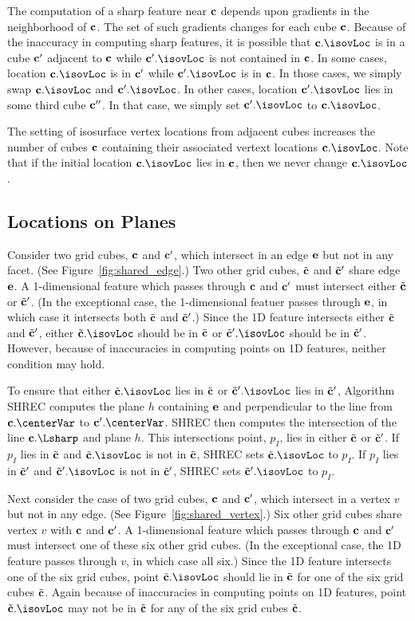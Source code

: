 The computation of a sharp feature near $\mathbf{c}$ depends
upon gradients in the neighborhood of $\mathbf{c}$.
The set of such gradients changes for each cube $\mathbf{c}$.
Because of the inaccuracy in computing sharp features,
it is possible that $\cb.\isovLoc$ is in a cube $\mathbf{c}'$ adjacent to $\mathbf{c}$
while $\cb'.\isovLoc$ is not contained in $\mathbf{c}$.
In some cases,
location $\cb.\isovLoc$ is in $\mathbf{c}'$ while $\cb'.\isovLoc$ is in $\mathbf{c}$.
In those cases,
we simply swap $\cb.\isovLoc$ and $\cb'.\isovLoc$.
In other cases, location $\cb'.\isovLoc$ lies in some third cube $\mathbf{c}''$.
In that case, we simply set $\cb'.\isovLoc$ to $\cb.\isovLoc$.

The setting of isosurface vertex locations from adjacent cubes
increases the number of cubes $\mathbf{c}$ containing 
their associated vertext locations $\cb.\isovLoc$.
Note that if the initial location $\cb.\isovLoc$ lies in $\mathbf{c}$,
then we never change $\cb.\isovLoc$.


\subsection{Locations on Planes}

Consider two grid cubes, $\mathbf{c}$ and $\mathbf{c}'$, 
which intersect in an edge $\mathbf{e}$ but not in any facet.
(See Figure~\ref{fig:shared_edge}.)
Two other grid cubes, ${\tilde{\mathbf{c}}}$ and ${\tilde{\mathbf{c}}}'$ share edge $\mathbf{e}$.
A 1-dimensional feature which passes through $\mathbf{c}$ and $\mathbf{c}'$ must intersect
either ${\tilde{\mathbf{c}}}$ or ${\tilde{\mathbf{c}}}'$.
(In the exceptional case, the 1-dimensional featuer passes through $\mathbf{e}$,
in which case it intersects both ${\tilde{\mathbf{c}}}$ and ${\tilde{\mathbf{c}}}'$.)
Since the 1D feature intersects either ${\tilde{\mathbf{c}}}$ and ${\tilde{\mathbf{c}}}'$,
either $\tcb.\isovLoc$ should be in ${\tilde{\mathbf{c}}}$ 
or $\tcb'.\isovLoc$ should be in ${\tilde{\mathbf{c}}}'$.
However, because of inaccuracies in computing points on 1D features,
neither condition may hold.

To ensure that either $\tcb.\isovLoc$ lies in ${\tilde{\mathbf{c}}}$
or $\tcb'.\isovLoc$ lies in ${\tilde{\mathbf{c}}}'$,
Algorithm SHREC computes the plane $h$ containing $\mathbf{e}$
and perpendicular to the line from $\cb.\centerVar$ to $\cb'.\centerVar$.
SHREC then computes the intersection of the line $\cb.\Lsharp$ 
and plane $h$.
This intersections point, $p_I$, lies in either ${\tilde{\mathbf{c}}}$ or ${\tilde{\mathbf{c}}}'$.
If $p_I$ lies in ${\tilde{\mathbf{c}}}$ and $\tcb.\isovLoc$ is not in ${\tilde{\mathbf{c}}}$,
SHREC sets $\tcb.\isovLoc$ to $p_I$.
If $p_I$ lies in ${\tilde{\mathbf{c}}}'$ and $\tcb'.\isovLoc$ is not in ${\tilde{\mathbf{c}}}'$,
SHREC sets $\tcb'.\isovLoc$ to $p_I$.

Next consider the case of two grid cubes, $\mathbf{c}$ and $\mathbf{c}'$, 
which intersect in a vertex $v$ but not in any edge.
(See Figure~\ref{fig:shared_vertex}.)
Six other grid cubes share vertex $v$ with $\mathbf{c}$ and $\mathbf{c}'$.
A 1-dimensional feature which passes through $\mathbf{c}$ and $\mathbf{c}'$ must intersect
one of these six other grid cubes.
(In the exceptional case, the 1D feature passes through $v$,
in which case all six.)
Since the 1D feature intersects one of the six grid cubes,
point $\tcb.\isovLoc$ should lie in ${\tilde{\mathbf{c}}}$ for one of the six grid cubes ${\tilde{\mathbf{c}}}$.
Again because of inaccuracies in computing points on 1D features,
point $\tcb.\isovLoc$ may not be in ${\tilde{\mathbf{c}}}$ for any of the six grid cubes ${\tilde{\mathbf{c}}}$.

